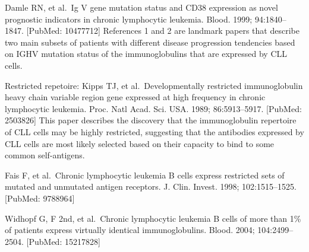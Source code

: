 \documentclass[11pt, a4paper, twosided]{book}
\begin{document}
Damle RN, et al.~Ig V gene mutation status and CD38 expression as novel prognostic indicators in chronic lymphocytic leukemia. Blood. 1999; 94:1840--1847. {[}PubMed: 10477712{]} References 1 and 2 are landmark papers that describe two main subsets of patients with different disease progression tendencies based on IGHV mutation status of the immunoglobulins that are expressed by CLL cells.

Restricted repetoire:
Kipps TJ, et al.~Developmentally restricted immunoglobulin heavy chain variable region gene expressed at high frequency in chronic lymphocytic leukemia. Proc. Natl Acad. Sci. USA. 1989; 86:5913--5917. {[}PubMed: 2503826{]} This paper describes the discovery that the immunoglobulin repertoire of CLL cells may be highly restricted, suggesting that the antibodies expressed by CLL cells are most likely selected based on their capacity to bind to some common self-antigens.

Fais F, et al.~Chronic lymphocytic leukemia B cells express restricted sets of mutated and unmutated antigen receptors. J. Clin. Invest. 1998; 102:1515--1525. {[}PubMed: 9788964{]}

Widhopf G, F 2nd, et al.~Chronic lymphocytic leukemia B cells of more than 1\% of patients express virtually identical immunoglobulins. Blood. 2004; 104:2499--2504. {[}PubMed: 15217828{]}
\end{document}
